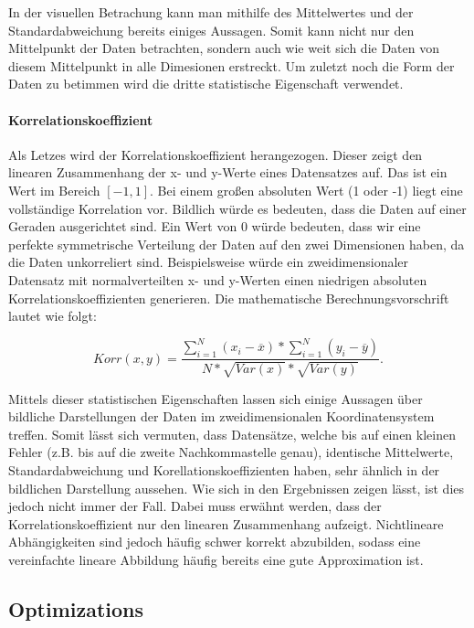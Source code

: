 \documentclass[sigconf]{acmart}
\begin{document}
In der visuellen Betrachung kann man mithilfe des Mittelwertes und der Standardabweichung bereits einiges Aussagen. Somit kann nicht nur den Mittelpunkt der Daten betrachten, sondern auch wie weit sich die Daten von diesem Mittelpunkt in alle Dimesionen erstreckt. Um zuletzt noch die Form der Daten zu betimmen wird die dritte statistische Eigenschaft verwendet.

\paragraph{Korrelationskoeffizient}

Als Letzes wird der Korrelationskoeffizient herangezogen. Dieser zeigt den linearen Zusammenhang der x- und y-Werte eines Datensatzes auf. Das ist ein Wert im Bereich $[-1,1]$. Bei einem großen absoluten Wert (1 oder -1) liegt eine vollständige Korrelation vor. Bildlich würde es bedeuten, dass die Daten auf einer Geraden ausgerichtet sind. Ein Wert von 0 würde bedeuten, dass wir eine perfekte symmetrische Verteilung der Daten auf den zwei Dimensionen haben, da die Daten unkorreliert sind. Beispielsweise würde ein zweidimensionaler Datensatz mit normalverteilten x- und y-Werten einen niedrigen absoluten Korrelationskoeffizienten generieren. Die mathematische Berechnungsvorschrift lautet wie folgt:

$$
Korr(x,y)= \frac{
  \sum_{i=1}^{N}(x_i - \overline{x})* \sum_{i=1}^{N}(y_i - \overline{y})
}{
  N * \sqrt{Var(x)} * \sqrt{Var(y)}
}.
$$

Mittels dieser statistischen Eigenschaften lassen sich einige Aussagen über bildliche Darstellungen der Daten im zweidimensionalen Koordinatensystem treffen. Somit lässt sich vermuten, dass Datensätze, welche bis auf einen kleinen Fehler (z.B. bis auf die zweite Nachkommastelle genau), identische Mittelwerte, Standardabweichung und Korellationskoeffizienten haben, sehr ähnlich in der bildlichen Darstellung aussehen. Wie sich in den Ergebnissen zeigen lässt, ist dies jedoch nicht immer der Fall. Dabei muss erwähnt werden, dass der Korrelationskoeffizient nur den linearen Zusammenhang aufzeigt. Nichtlineare Abhängigkeiten sind jedoch häufig schwer korrekt abzubilden, sodass eine vereinfachte lineare Abbildung häufig bereits eine gute Approximation ist.


\subsection{Optimizations}\label{sec:algo:opti}
\end{document}
